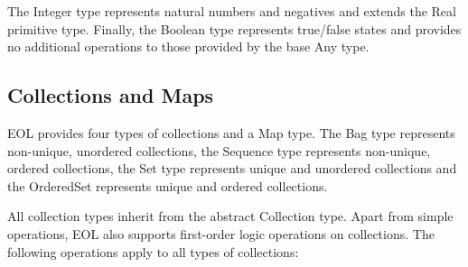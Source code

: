 The Integer type represents natural numbers and negatives and extends the Real primitive type. Finally, the Boolean type represents true/false states and provides no additional operations to those provided by the base Any type.

\subsection{Collections and Maps} 
\label{sec:Design.EOL.Collections}

EOL provides four types of collections and a Map type. The Bag type represents non-unique, unordered collections, the Sequence type represents non-unique, ordered collections, the Set type represents unique and unordered collections and the OrderedSet represents unique and ordered collections.

All collection types inherit from the abstract Collection type. Apart from simple operations, EOL also supports first-order logic operations on collections. The following operations apply to all types of collections:


